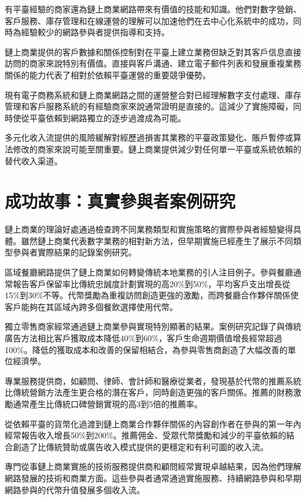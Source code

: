 \documentclass[
  Letterpaper,
]{scrbook}
\begin{document}
有平臺經驗的商家還為鏈上商業網路帶來有價值的技能和知識。他們對數字營銷、客戶服務、庫存管理和在線運營的理解可以加速他們在去中心化系統中的成功，同時為經驗較少的網路參與者提供指導和支持。

鏈上商業提供的客戶數據和關係控制對在平臺上建立業務但缺乏對其客戶信息直接訪問的商家來說特別有價值。直接與客戶溝通、建立電子郵件列表和發展重複業務關係的能力代表了相對於依賴平臺運營的重要競爭優勢。

現有電子商務系統和鏈上商業網路之間的運營整合對已經理解數字支付處理、庫存管理和客戶服務系統的有經驗商家來說通常證明是直接的。這減少了實施障礙，同時使從平臺依賴到網路獨立的逐步過渡成為可能。

多元化收入流提供的風險緩解對經歷過損害其業務的平臺政策變化、賬戶暫停或算法修改的商家來說可能至關重要。鏈上商業提供減少對任何單一平臺或系統依賴的替代收入渠道。

\section{成功故事：真實參與者案例研究}\label{ux6210ux529fux6545ux4e8bux771fux5be6ux53c3ux8207ux8005ux6848ux4f8bux7814ux7a76}

鏈上商業的理論好處通過檢查跨不同業務類型和實施策略的實際參與者經驗變得具體。雖然鏈上商業代表數字業務的相對新方法，但早期實施已經產生了展示不同類型參與者實際結果的記錄案例研究。

區域餐廳網路提供了鏈上商業如何轉變傳統本地業務的引人注目例子。參與餐廳通常報告客戶保留率比傳統忠誠度計劃實現的高20\%到50\%，平均客戶支出增長從15\%到30\%不等。代幣獎勵為重複訪問創造更強的激勵，而跨餐廳合作夥伴關係使客戶能夠在其區域內跨多個餐飲選擇使用代幣。

獨立零售商家經常通過鏈上商業參與實現特別顯著的結果。案例研究記錄了與傳統廣告方法相比客戶獲取成本降低40\%到60\%，客戶生命週期價值增長經常超過100\%。降低的獲取成本和改善的保留相結合，為參與零售商創造了大幅改善的單位經濟學。

專業服務提供商，如顧問、律師、會計師和醫療從業者，發現基於代幣的推薦系統比傳統營銷方法產生更合格的潛在客戶，同時創造更強的客戶關係。推薦的財務激勵通常產生比傳統口碑營銷實現的高3到5倍的推薦率。

從依賴平臺的貨幣化過渡到鏈上商業合作夥伴關係的內容創作者在參與的第一年內經常報告收入增長50\%到200\%。推薦佣金、受眾代幣獎勵和減少的平臺依賴的結合創造了比傳統贊助或廣告收入模式提供的更穩定和有利可圖的收入流。

專門從事鏈上商業實施的技術服務提供商和顧問經常實現卓越結果，因為他們理解網路發展的技術和商業方面。這些參與者通常通過實施服務、持續網路參與和早期網路參與的代幣升值發展多個收入流。
\end{document}
